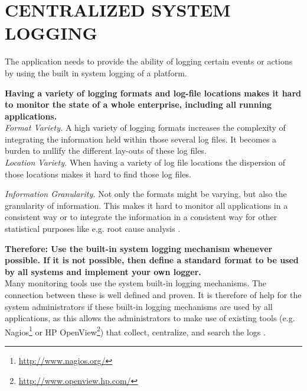 \newpage
\section*{CENTRALIZED SYSTEM LOGGING}

The application needs to provide the ability of logging certain events or actions by using the built in system logging of a platform. 

\begin{center}
  
\end{center}

\textbf{Having a variety of logging formats and log-file locations makes it hard to monitor the state of a whole enterprise, including all running applications.}\\

\textit{Format Variety.} A high variety of logging formats increases the complexity of integrating the information held within those several log files. It becomes a burden to nullify
the different lay-outs of these log files.\\ 

\textit{Location Variety.} When having a variety of log file locations the dispersion of those locations makes it hard to find those log files.

\textit{Information Granularity.} Not only the formats might be varying, but also the granularity of information. This makes it hard to monitor all applications in a consistent way or to integrate the information in a consistent way for other statistical purposes like e.g. root cause analysis \cite{conf/mkwi/PaschkeS06}.

\begin{center}
   
\end{center}

\textbf{Therefore: Use the built-in system logging mechanism whenever possible. If it is not possible, then define a standard format to be used by all systems and implement your own logger.}\\

Many monitoring tools use the system built-in logging mechanisms. The connection between these is well defined and proven. It is therefore of help for the system administrators if these built-in logging mechanisms are used by all applications, as this allows the administrators to make use of existing tools (e.g. Nagios\footnote{\url{http://www.nagios.org/}} or HP OpenView\footnote{\url{http://www.openview.hp.com/}}) that collect, centralize, and search the logs \cite{Limoncelli2011a}.

